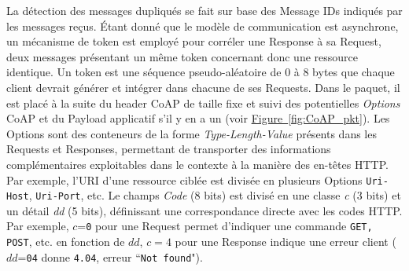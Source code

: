\documentclass[]{report}
\newcommand{\wordlink}[2]{\hyperref[#2]{#1~\ref{#2}}}
\begin{document}
\par La détection des messages dupliqués se fait sur base des Message IDs indiqués par les messages reçus. Étant donné que le modèle de communication est asynchrone, un mécanisme de token est employé pour corréler une Response à sa Request, deux messages présentant un même token concernant donc une ressource identique. Un token est une séquence pseudo-aléatoire de 0 à 8 bytes que chaque client devrait générer et intégrer dans chacune de ses Requests. Dans le paquet, il est placé à la suite du header CoAP de taille fixe et suivi des potentielles \textit{Options} CoAP et du Payload applicatif s'il y en a un (voir \wordlink{Figure}{fig:CoAP_pkt}). Les Options sont des conteneurs de la forme \textit{Type-Length-Value} présents dans les Requests et Responses, permettant de transporter des informations complémentaires exploitables dans le contexte à la manière des en-têtes HTTP. Par exemple, l'URI d'une ressource ciblée est divisée en plusieurs Options \texttt{Uri-Host}, \texttt{Uri-Port}, etc. Le champs \textit{Code} (8 bits) est divisé en une classe \textit{c} (3 bits) et un détail \textit{dd} (5 bits), définissant une correspondance directe avec les codes HTTP. Par exemple, $c$=\texttt{0} pour une Request permet d'indiquer une commande \texttt{GET, POST}, etc. en fonction de $dd$, $c=4$ pour une Response indique une erreur client ($dd$=\texttt{04} donne \texttt{4.04}, erreur ``\texttt{Not found}").
\end{document}
